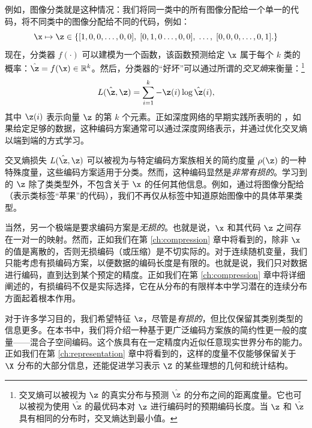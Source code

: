 \documentclass[../../book-main.tex]{subfiles}
\begin{document}
\begin{example}
例如，图像分类就是这种情况：我们将同一类中的所有图像分配给一个单一的代码，将不同类中的图像分配给不同的代码，例如：
\begin{equation}
  \x \mapsto \z \in \{  [1, 0, 0, \ldots , 0, 0], \;  [0, 1, 0 \ldots, 0, 0], \; \ldots, \;  [0,0,0, \ldots, 0, 1].\}
  \label{eqn:class-labels}
\end{equation}
现在，分类器 $f(\cdot)$ 可以建模为一个函数，该函数预测给定 $\x$ 属于每个 $k$ 类的概率：$\hat{\z} = f(\x) \in \mathbb{R}^k$。然后，分类器的“好坏”可以通过所谓的{\em 交叉熵}来衡量：\footnote{交叉熵可以被视为 $\z$ 的真实分布与预测 $\hat\z$ 的分布之间的距离度量。它也可以被视为使用 $\hat \z$ 的最优码本对 $\z$ 进行编码时的预期编码长度。当 $\z$ 和 $\hat \z$ 具有相同的分布时，交叉熵达到最小值。}
\begin{equation}
    L(\hat{\z}, \z) = \sum_{i=1}^k - \z(i) \log \hat{\z}(i),
\end{equation}
其中 $\z(i)$ 表示向量 $\z$ 的第 $k$ 个元素。正如深度网络的早期实践所表明的 \cite{Krizhevsky2012imagenet}，如果给定足够的数据，这种编码方案通常可以通过深度网络表示，并通过优化交叉熵以端到端的方式学习。
\end{example}

交叉熵损失 $L(\hat \z, \z)$ 可以被视为与特定编码方案族相关的简约度量 $\rho(\z)$ 的一种特殊度量，这些编码方案适用于分类。然而，这种编码显然是{\em 非常有损的}。学习到的 $\z$ 除了类类型外，不包含关于 $\x$ 的任何其他信息。例如，通过将图像分配给（表示类标签“苹果”的代码），我们不再仅从标签中知道原始图像中的具体苹果类型。

当然，另一个极端是要求编码方案是{\em 无损的}。也就是说，$\x$ 和其代码 $\z$ 之间存在一对一的映射。然而，正如我们在第 \ref{ch:compression} 章中将看到的，除非 $\x$ 的值是离散的，否则无损编码（或压缩）是不切实际的。对于连续随机变量，我们只能考虑有损编码方案，以便数据的编码长度是有限的。也就是说，我们只对数据进行编码，直到达到某个预定的精度。正如我们在第 \ref{ch:compression} 章中将详细阐述的，有损编码不仅是实际选择，它在从分布的有限样本中学习潜在的连续分布方面起着根本作用。

对于许多学习目的，我们希望特征 $\z$，尽管是{\em 有损的}，但比仅保留其类别类型的信息更多。在本书中，我们将介绍一种基于更广泛编码方案族的简约性更一般的度量——混合子空间编码。这个族具有在一定精度内近似任意现实世界分布的能力。正如我们在第 \ref{ch:representation} 章中将看到的，这样的度量不仅能够保留关于 $\X$ 分布的大部分信息，还能促进学习表示 $\Z$ 的某些理想的几何和统计结构。
\end{document}
